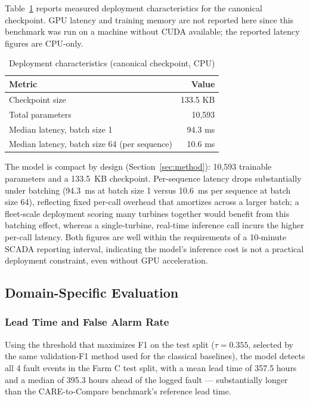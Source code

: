 \documentclass[conference]{IEEEtran}
\begin{document}
Table~\ref{tab:deployment} reports measured deployment characteristics for
the canonical checkpoint. GPU latency and training memory are not
reported here since this benchmark was run on a machine without CUDA
available; the reported latency figures are CPU-only.
 
\begin{table}[t]
\caption{Deployment characteristics (canonical checkpoint, CPU)}
\label{tab:deployment}
\centering
\begin{tabular}{@{}lr@{}}
\toprule
Metric & Value \\
\midrule
Checkpoint size & 133.5 KB \\
Total parameters & 10{,}593 \\
Median latency, batch size 1 & 94.3 ms \\
Median latency, batch size 64 (per sequence) & 10.6 ms \\
\bottomrule
\end{tabular}
\end{table}
 
The model is compact by design (Section~\ref{sec:method}): 10{,}593
trainable parameters and a 133.5~KB checkpoint. Per-sequence latency drops
substantially under batching (94.3~ms at batch size 1 versus 10.6~ms per
sequence at batch size 64), reflecting fixed per-call overhead that
amortizes across a larger batch; a fleet-scale deployment scoring many
turbines together would benefit from this batching effect, whereas a
single-turbine, real-time inference call incurs the higher per-call
latency. Both figures are well within the requirements of a 10-minute
SCADA reporting interval, indicating the model's inference cost is not a
practical deployment constraint, even without GPU acceleration.
 
\subsection{Domain-Specific Evaluation}
 
\subsubsection{Lead Time and False Alarm Rate}
 
Using the threshold that maximizes F1 on the test split ($\tau = 0.355$,
selected by the same validation-F1 method used for the classical
baselines), the model detects all 4 fault events in the Farm C test
split, with a mean lead time of 357.5 hours and a median of 395.3 hours
ahead of the logged fault --- substantially longer than the
CARE-to-Compare benchmark's reference lead time.
 
\end{document}
